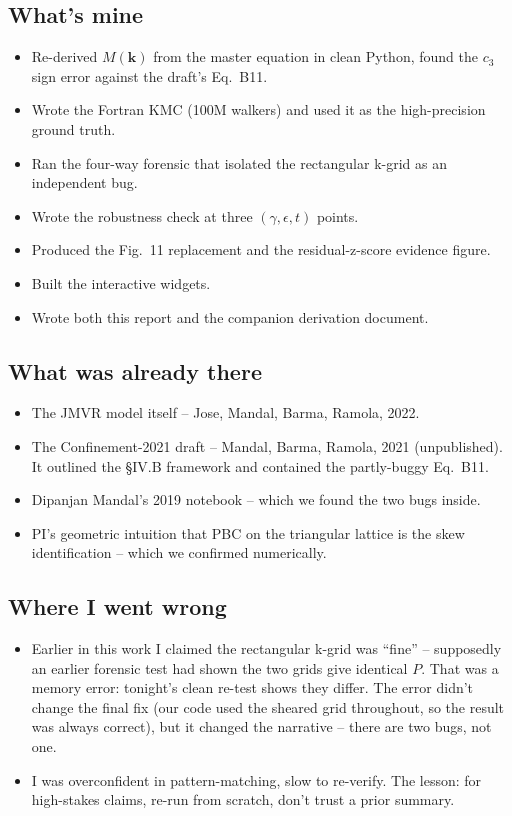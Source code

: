 \documentclass[11pt,a4paper]{article}
\newcommand{\vk}{\mathbf{k}}
\begin{document}
\subsection{What's mine}\label{ssec:mine}

\begin{itemize}[leftmargin=*]
\item Re-derived $M(\vk)$ from the master equation in clean Python,
  found the $c_3$ sign error against the draft's Eq.~B11.
\item Wrote the Fortran KMC (100M walkers) and used it as the
  high-precision ground truth.
\item Ran the four-way forensic that isolated the rectangular k-grid
  as an independent bug.
\item Wrote the robustness check at three $(\gamma, \epsilon, t)$ points.
\item Produced the Fig.~11 replacement and the residual-z-score
  evidence figure.
\item Built the interactive widgets.
\item Wrote both this report and the companion derivation document.
\end{itemize}

\subsection{What was already there}\label{ssec:already}

\begin{itemize}[leftmargin=*]
\item The JMVR model itself -- Jose, Mandal, Barma, Ramola, 2022.
\item The Confinement-2021 draft -- Mandal, Barma, Ramola, 2021
  (unpublished). It outlined the §IV.B framework and contained the
  partly-buggy Eq.~B11.
\item Dipanjan Mandal's 2019 notebook -- which we found the two bugs
  inside.
\item PI's geometric intuition that PBC on the triangular lattice is
  the skew identification -- which we confirmed numerically.
\end{itemize}

\subsection{Where I went wrong}\label{ssec:wrong}

\begin{itemize}[leftmargin=*]
\item Earlier in this work I claimed the rectangular k-grid was
  ``fine'' -- supposedly an earlier forensic test had shown the two
  grids give identical $P$. That was a memory error: tonight's clean
  re-test shows they differ. The error didn't change the final fix
  (our code used the sheared grid throughout, so the result was always
  correct), but it changed the narrative -- there are two bugs, not one.
\item I was overconfident in pattern-matching, slow to re-verify. The
  lesson: for high-stakes claims, re-run from scratch, don't trust a
  prior summary.
\end{itemize}
\end{document}
